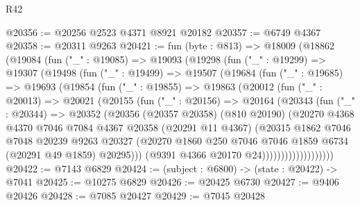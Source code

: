 \begin{lexlean}{R42}
\begin{coremodule}
{@20356 := @20256 @2523 @4371 @8921 @20182
@20357 := @6749 @4367
@20358 := @20311 @9263
@20421 := fun (byte : @813) =>
  @18009
    (@18862
      (@19084
        (fun ("_" : @19085) =>
        @19093
          (@19298
            (fun ("_" : @19299) =>
            @19307
              (@19498
                (fun ("_" : @19499) =>
                @19507
                  (@19684
                    (fun ("_" : @19685) =>
                    @19693
                      (@19854
                        (fun ("_" : @19855) =>
                        @19863
                          (@20012
                            (fun ("_" : @20013) =>
                            @20021
                              (@20155
                                (fun ("_" : @20156) =>
                                @20164
                                  (@20343
                                    (fun ("_" : @20344) =>
                                    @20352
                                      (@20356
                                        (@20357 @20358)
                                        (@810 @20190)
                                        (@20270
                                          @4368
                                          @4370
                                          @7046
                                          @7084
                                          @4367
                                          @20358
                                          (@20291 @11 @4367)
                                          (@20315
                                            @1862
                                            @7046
                                            @7048
                                            @20239
                                            @9263
                                            @20327
                                            (@20270
                                              @1860
                                              @250
                                              @7046
                                              @7046
                                              @1859
                                              @6734
                                              (@20291 @49 @1859)
                                              @20295)))
                                        (@9391 @4366 @20170 @24)))))))))))))))))))
@20422 := @7143 @6829
@20424 := (subject : @6800) -> (state : @20422) -> @7041
@20425 := @10275 @6829
@20426 := @20425 @6730
@20427 := @9406 @20426
@20428 := @7085 @20427
@20429 := @7045 @20428
}
\end{coremodule}
\end{lexlean}
